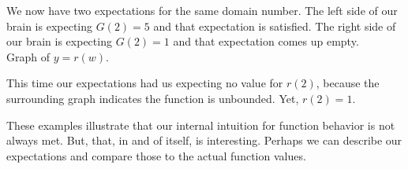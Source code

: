 \documentclass{ximera}
\begin{document}
We now have two expectations for the same domain number. The left side of our brain is expecting $G(2)=5$ and that expectation is satisfied.  The right side of our brain is expecting $G(2)=1$ and that expectation comes up empty. \\







Graph of $y = r(w)$.

\begin{image}
\end{image}



This time our expectations had us expecting no value for $r(2)$, because the surrounding graph indicates the function is unbounded.  Yet, $r(2) = 1$.



















These examples illustrate that our internal intuition for function behavior is not always met.  But, that, in and of itself, is interesting.  Perhaps we can describe our expectations and compare those to the actual function values. \\
\end{document}
